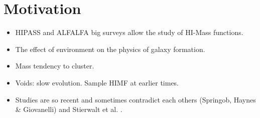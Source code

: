 \documentclass[xcolor=dvipsnames]{beamer}
\begin{document}
\section{Motivation}
\begin{frame}
\begin{itemize}
\item HIPASS and ALFALFA big surveys allow the study of HI-Mass functions.
\item The effect of environment on the physics of galaxy formation.
\item Mass tendency to cluster.
\item Voids: slow evolution. Sample HIMF at earlier times.
\item Studies are so recent and sometimes contradict each others (Springob, Haynes \& Giovanelli) \cite{contra1} and Stierwalt et al. \cite{contra2}.
\end{itemize}
\end{frame}
\end{document}
